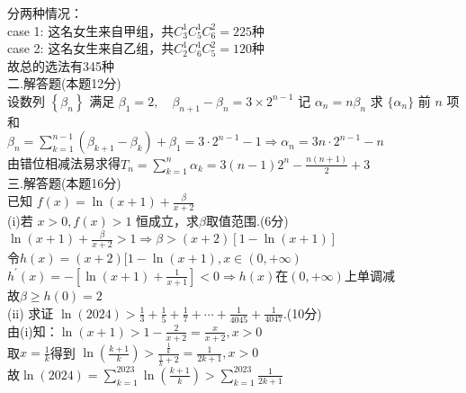 \documentclass[a4paper,11pt,UTF8]{article}
\begin{document}
分两种情况：\\
case 1: 这名女生来自甲组，共$C_3^1C_5^1C_6^2=225$种\\
case 2: 这名女生来自乙组，共$C_2^1C_6^1C_5^2=120$种\\
故总的选法有345种\\
二.解答题(本题12分)\\
设数列 $\displaystyle\left\{\beta_n\right\}$ 满足 $\displaystyle\beta_1=2 ,\quad \beta_{n+1}-\beta_n=3\times 2^{n-1}$ 记 $\alpha_n=n \beta_n$ 求 $\{\alpha_n\}$ 前 $n$ 项和 \\
$\displaystyle\beta_n=\sum_{k=1}^{n-1}(\beta_{k+1}-\beta_{k})+\beta_1=3\cdot2^{n-1}-1\Rightarrow\alpha_n=3n\cdot2^{n-1}-n$\\
由错位相减法易求得$\displaystyle T_n=\sum_{k=1}^{n}\alpha_k=3(n-1)2^{n}-\frac{n(n+1)}{2}+3$\\
三.解答题(本题16分)\\
已知 $\displaystyle f(x)=\ln (x+1)+\frac{\beta}{x+2}$\\
(i)若 $x>0 , f(x)>1$ 恒成立，求$\beta$取值范围.(6分)\\
$\displaystyle \ln (x+1)+\frac{\beta}{x+2}>1\Rightarrow \beta>(x+2)[1-\ln(x+1)]$\\ 
令$h(x)=(x+2)[1-\ln(x+1), x\in(0,+\infty)$\\
$\displaystyle h^{\prime}(x)=-[\ln(x+1)+\frac{1}{x+1}]<0\Rightarrow h(x)$在$(0,+\infty)$上单调减\\
故$\beta\geq h(0)=2$\\
(ii) 求证 $\displaystyle\ln (2024)>\frac{1}{3}+\frac{1}{5}+\frac{1}{7}+\cdots+\frac{1}{4045}+\frac{1}{4047}$.(10分)\\
由(i)知：$\displaystyle\ln(x+1)>1-\frac{2}{x+2}=\frac{x}{x+2},x>0$\\
取$\displaystyle x=\frac{1}{k}$得到 $\displaystyle\ln(\frac{k+1}{k})>\frac{\displaystyle\frac{1}{k}}{\displaystyle\frac{1}{k}+2}=\frac{1}{2k+1},x>0$\\
故$\displaystyle\ln(2024)=\sum_{k=1}^{2023}\ln(\frac{k+1}{k})>\sum_{k=1}^{2023}\frac{1}{2k+1}$\\
\end{document}
